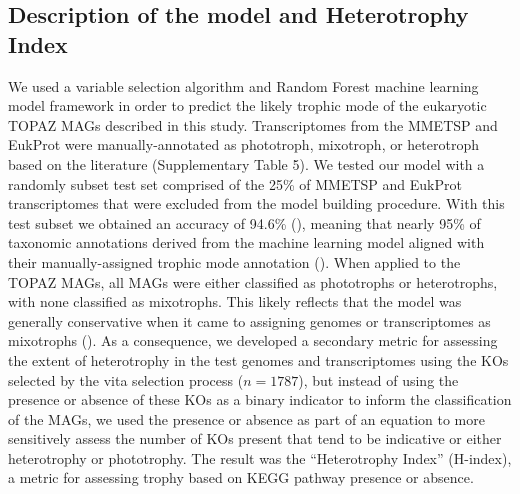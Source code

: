\documentclass[12pt]{article}
\numberwithin{equation}{section}
\begin{document}
\subsection{Description of the model and Heterotrophy Index}
We used a variable selection algorithm and Random Forest machine learning model framework in order to predict the likely trophic mode of the eukaryotic TOPAZ MAGs described in this study. Transcriptomes from the MMETSP and EukProt were manually-annotated as phototroph, mixotroph, or heterotroph based on the literature (Supplementary Table 5). We tested our model with a randomly subset test set comprised of the 25\% of MMETSP and EukProt transcriptomes \citep{Keeling2014,Richter2020EukProt} that were excluded from the model building procedure. With this test subset we obtained an accuracy of 94.6\% (), meaning that nearly 95\% of taxonomic annotations derived from the machine learning model aligned with their manually-assigned trophic mode annotation ().  When applied to the TOPAZ MAGs, all MAGs were either classified as phototrophs or heterotrophs, with none classified as  mixotrophs. This likely reflects that the model was generally conservative when it came to assigning genomes or transcriptomes as mixotrophs (). As a consequence, we developed a secondary metric for assessing the extent of heterotrophy in the test genomes and transcriptomes using the KOs selected by the vita selection process ($n=1787$), but instead of using the presence or absence of these KOs as a binary indicator to inform the classification of the MAGs, we used the presence or absence as part of an equation to more sensitively assess the number of KOs present that tend to be indicative or either heterotrophy or phototrophy. The result was the ``Heterotrophy Index'' (H-index), a metric for assessing trophy based on KEGG pathway presence or absence. 
\end{document}

